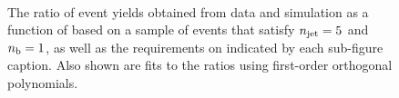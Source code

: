 \begin{figure}[h!]
\begin{center}
    \\
    \caption{The ratio of event yields obtained from data and simulation as a function of \mht [GeV] based on a sample of \mj events that satisfy $n_{\text{jet}} = 5$ and $n_{\text{b}} = 1$, as well as the requirements on \scalht indicated by each sub-figure caption. Also shown are fits to the ratios using first-order orthogonal polynomials.}
    \label{fig:mhtval_Mu_eq5j_eq1b}
  \end{center}
\end{figure}


